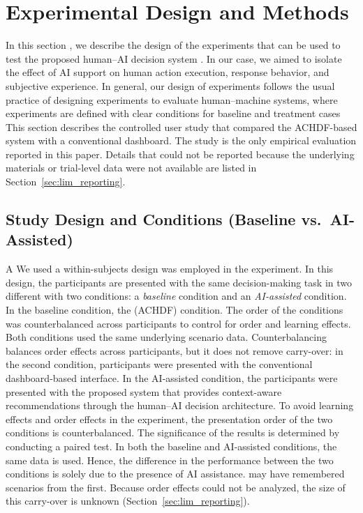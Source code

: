 \documentclass[journal]{IEEEtran}
\theoremstyle{plain}
\theoremstyle{definition}
\providecommand{\DIFaddtex}[1]{{\protect\color{blue} \sf #1}} %
\providecommand{\DIFdeltex}[1]{{\protect\color{red} \scriptsize #1}} %
\providecommand{\DIFaddbegin}{} %
\providecommand{\DIFaddend}{} %
\providecommand{\DIFdelbegin}{} %
\providecommand{\DIFdelend}{} %
\providecommand{\DIFadd}[1]{\texorpdfstring{\DIFaddtex{#1}}{#1}} %
\providecommand{\DIFdel}[1]{\texorpdfstring{\DIFdeltex{#1}}{}} %
\newcommand{\DIFscaledelfig}{0.5}
\newlength{\DIFdelgraphicswidth} %
\newlength{\DIFdelgraphicsheight} %
\newcommand{\DIFaddincludegraphics}[2][]{{\color{blue}\fbox{\DIFOincludegraphics[#1]{#2}}}} %
\newcommand{\DIFdelincludegraphics}[2][]{%
\sbox{\DIFdelgraphicsbox}{\DIFOincludegraphics[#1]{#2}}%
\settoboxwidth{\DIFdelgraphicswidth}{\DIFdelgraphicsbox} %
\settoboxtotalheight{\DIFdelgraphicsheight}{\DIFdelgraphicsbox} %
\scalebox{\DIFscaledelfig}{%
\parbox[b]{\DIFdelgraphicswidth}{\usebox{\DIFdelgraphicsbox}\\[-\baselineskip] \rule{\DIFdelgraphicswidth}{0em}}\llap{\resizebox{\DIFdelgraphicswidth}{\DIFdelgraphicsheight}{%
\setlength{\unitlength}{\DIFdelgraphicswidth}%
\begin{picture}(1,1)%
\thicklines\linethickness{2pt} %
{\color[rgb]{1,0,0}\put(0,0){\framebox(1,1){}}}%
{\color[rgb]{1,0,0}\put(0,0){\line( 1,1){1}}}%
{\color[rgb]{1,0,0}\put(0,1){\line(1,-1){1}}}%
\end{picture}%
}\hspace*{3pt}}} %
} %
\DeclareRobustCommand{\DIFaddbegin}{\DIFOaddbegin \let\includegraphics\DIFaddincludegraphics} %
\DeclareRobustCommand{\DIFaddend}{\DIFOaddend \let\includegraphics\DIFOincludegraphics} %
\DeclareRobustCommand{\DIFdelbegin}{\DIFOdelbegin \let\includegraphics\DIFdelincludegraphics} %
\DeclareRobustCommand{\DIFdelend}{\DIFOaddend \let\includegraphics\DIFOincludegraphics} %
\begin{document}
    \section{Experimental Design and Methods}

    \DIFdelbegin \DIFdel{In this section , we describe the design of the experiments that can be used to test the proposed human--AI decision system . In our case, we aimed to isolate the effect of AI support on human action execution, response behavior, and subjective experience. In general, our design of experiments follows the usual practice of designing experiments to evaluate human--machine systems, where experiments are defined with clear conditions for baseline and treatment cases}\DIFdelend \DIFaddbegin \DIFadd{This section describes the controlled user study that compared the ACHDF-based system with a conventional dashboard. The study is the only empirical evaluation reported in this paper. Details that could not be reported because the underlying materials or trial-level data were not available are listed in Section~\ref{sec:lim_reporting}}\DIFaddend .

    \subsection{Study Design and Conditions\DIFdelbegin \DIFdel{(Baseline vs.\ AI-Assisted)}\DIFdelend }

    \DIFdelbegin \DIFdel{A }\DIFdelend \DIFaddbegin \DIFadd{We used a }\DIFaddend within-subjects design \DIFdelbegin \DIFdel{was employed in the experiment. In this design, the participants are presented with the same decision-making task in two different }\DIFdelend \DIFaddbegin \DIFadd{with two }\DIFaddend conditions: a \emph{baseline} condition and an \emph{AI-assisted} \DIFdelbegin \DIFdel{condition. In the baseline condition, the }\DIFdelend \DIFaddbegin \DIFadd{(ACHDF) condition. The order of the conditions was counterbalanced across participants to control for order and learning effects. Both conditions used the same underlying scenario data. Counterbalancing balances order effects across participants, but it does not remove carry-over: in the second condition, }\DIFaddend participants \DIFdelbegin \DIFdel{were presented with the conventional dashboard-based interface. In the AI-assisted condition, the participants were presented with the proposed system that provides context-aware recommendations through the human--AI decision architecture. To avoid learning effects and order effects in the experiment, the presentation order of the two conditions is counterbalanced.
The significance of the results is determined by conducting a paired test.
    In both the baseline and AI-assisted conditions, the same data is used.
Hence, the difference in the performance between the two conditions is solely due to the presence of AI assistance. }\DIFdelend \DIFaddbegin \DIFadd{may have remembered scenarios from the first. Because order effects could not be analyzed, the size of this carry-over is unknown (Section~\ref{sec:lim_reporting}).
}\DIFaddend 
\end{document}
